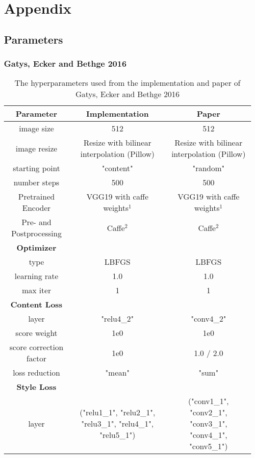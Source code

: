\newpage
\section{Appendix} 

\subsection{Parameters} \label{sec:parameters_appendix}
\subsubsection{Gatys, Ecker and Bethge 2016}

\begin{landscape}
\begin{table*}[!t]
	\renewcommand{\arraystretch}{1.0}
	\caption{The hyperparameters used from the implementation and paper of Gatys, Ecker and Bethge 2016 \cite{GEB2016}}
	\label{tab:GEB2016_parameters}
	\centering
	\begin{tabular}{c|c|c}
		\hline
		\bfseries Parameter & \bfseries Implementation & \bfseries Paper\\
		\hline\hline
		image size & 512 & 512 \\
		image resize & Resize with bilinear interpolation (Pillow) & Resize with bilinear interpolation (Pillow)\\
		starting point & "content" & "random" \\
		number steps & 500 & 500 \\
		Pretrained Encoder & VGG19 with caffe weights$^1$ & VGG19 with caffe weights$^1$ \\
		Pre- and Postprocessing & Caffe$^2$ & Caffe$^2$\\
		\hline
		\bfseries Optimizer & &\\
		\hline
		type & LBFGS & LBFGS\\
		learning rate & 1.0 & 1.0\\
		max iter & 1 & 1 \\
		\hline
		\bfseries  Content Loss & & \\
		\hline
		layer & "relu4\_2" & "conv4\_2" \\
		score weight & 1e0 & 1e0 \\
 		score correction factor & 1e0 & 1.0 / 2.0 \\
		loss reduction & "mean" & "sum" \\
		\hline
		\bfseries  Style Loss & & \\
		\hline
		layer & ("relu1\_1", "relu2\_1", "relu3\_1", "relu4\_1", "relu5\_1") & ("conv1\_1", "conv2\_1", "conv3\_1", "conv4\_1", "conv5\_1") \\

\end{tabular}
\end{table*}
\end{landscape}
